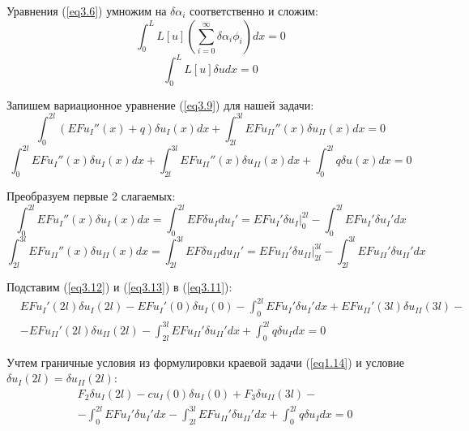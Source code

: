 Уравнения (\ref{eq3.6}) умножим на $\delta \alpha_i$ соответственно и сложим:
\begin{equation}
    \label{eq3.8}
    \int_{0}^{L} L[u] (\sum_{i = 0}^{\infty} \delta \alpha_i \phi_i) dx = 0
\end{equation}
\begin{equation}
    \label{eq3.9}
    \int_{0}^{L} L[u] \delta u dx = 0
\end{equation}

Запишем вариационное уравнение (\ref{eq3.9}) для нашей задачи:
\begin{equation}
    \label{eq3.10}
    \int_{0}^{2l} (EFu_I''(x) + q)\delta u_I(x) dx + \int_{2l}^{3l} EFu_{II}''(x) \delta u_{II}(x) dx = 0
\end{equation}
\begin{equation}
    \label{eq3.11}
    \int_{0}^{2l} EFu_I''(x) \delta u_I(x) dx + \int_{2l}^{3l} EFu_{II}''(x) \delta u_{II}(x) dx + \int_{0}^{2l} q \delta u(x) dx = 0
\end{equation}

Преобразуем первые 2 слагаемых:
\begin{equation}
    \label{eq3.12}
    \int_{0}^{2l} EFu_I''(x) \delta u_I(x) dx = \int_{0}^{2l} EF \delta u_I du_I' = EFu_I' \delta u_I \Big|_{0}^{2l} - \int_{0}^{2l} EFu_I' \delta u_I' dx
\end{equation}
\begin{equation}
    \label{eq3.13}
    \int_{2l}^{3l} EFu_{II}''(x) \delta u_{II}(x) dx = \int_{2l}^{3l} EF \delta u_{II} du_{II}' = EFu_{II}' \delta u_{II} \Big|_{2l}^{3l} - \int_{2l}^{3l} EFu_{II}' \delta u_{II}' dx
\end{equation}

Подставим (\ref{eq3.12}) и (\ref{eq3.13}) в (\ref{eq3.11}):
\begin{equation}
    \label{eq3.14}
    \begin{split}
        & EFu_I'(2l) \delta u_I(2l) - EFu_I'(0) \delta u_I(0) - \int_{0}^{2l} EFu_I' \delta u_I' dx + EFu_{II}'(3l) \delta u_{II}(3l) -
        \\
        & - EFu_{II}'(2l) \delta u_{II}(2l) - \int_{2l}^{3l} EFu_{II}' \delta u_{II}' dx + \int_{0}^{2l} q \delta u_I dx = 0
    \end{split}
\end{equation}

Учтем граничные условия из формулировки краевой задачи (\ref{eq1.14}) и условие $\delta u_I(2l) = \delta u_{II}(2l)$:
\begin{equation}
    \label{eq3.15}
    \begin{split}
        & F_2 \delta u_I(2l) - cu_I(0) \delta u_I(0) + F_3 \delta u_{II}(3l) -
        \\
        & - \int_{0}^{2l} EFu_I' \delta u_I' dx - \int_{2l}^{3l} EFu_{II}' \delta u_{II}' dx + \int_{0}^{2l} q \delta u_I dx = 0
    \end{split}
\end{equation}


